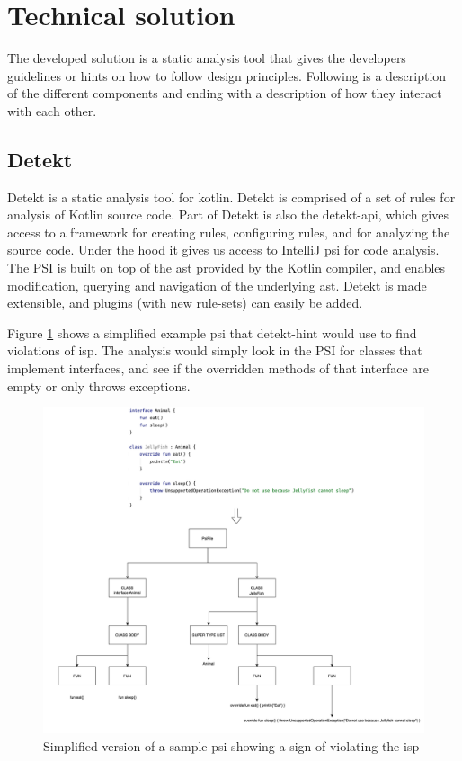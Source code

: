 \documentclass{report}
\begin{document}
\section{Technical solution}
\label{technical-solution}

The developed solution is a static analysis tool that gives the developers guidelines or hints on how to follow design principles. Following is a description of the different components and ending with a description of how they interact with each other.


\subsection{Detekt}
Detekt is a static analysis tool for kotlin. Detekt is comprised of a set of rules for analysis of Kotlin source code. Part of Detekt is also the detekt-api, which gives access to a framework for creating rules, configuring rules, and for analyzing the source code. Under the hood it gives us access to IntelliJ \gls{psi} for code analysis. The PSI is built on top of the \gls{ast} provided by the Kotlin compiler, and enables modification, querying and navigation of the underlying \gls{ast}. Detekt is made extensible, and plugins (with new rule-sets) can easily be added.   

Figure \ref{fig:psi} shows a simplified example \gls{psi} that detekt-hint would use to find violations of \gls{isp}. The analysis would simply look in the PSI for classes that implement interfaces, and see if the overridden methods of that interface are empty or only throws exceptions. 

\begin{figure}[h!]
    \centering
    \includegraphics[width=\linewidth]{report/images/psi.png}
    \caption{Simplified version of a sample \gls{psi} showing a sign of violating the \gls{isp}}
    \label{fig:psi}
\end{figure}
\end{document}
